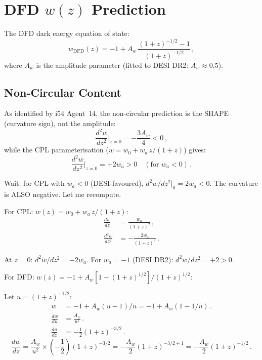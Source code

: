 \documentclass[11pt,a4paper]{article}
\begin{document}
\section{DFD $w(z)$ Prediction}

The DFD dark energy equation of state:
\begin{equation}
w_{\mathrm{DFD}}(z) = -1 + A_w\,\frac{(1+z)^{-1/2} - 1}{(1+z)^{-1/2}}\,,
\end{equation}
where $A_w$ is the amplitude parameter (fitted to DESI DR2: $A_w \approx 0.5$).

\subsection{Non-Circular Content}

As identified by i54 Agent~14, the non-circular prediction is the SHAPE (curvature sign), not the amplitude:
\begin{equation}
\frac{d^2w}{dz^2}\bigg|_{z=0} = -\frac{3A_w}{4} < 0\,,
\end{equation}
while the CPL parameterisation ($w = w_0 + w_a\,z/(1+z)$) gives:
\begin{equation}
\frac{d^2w}{dz^2}\bigg|_{z=0} = +2w_a > 0\quad (\text{for } w_a < 0)\,.
\end{equation}

Wait: for CPL with $w_a < 0$ (DESI-favoured), $d^2w/dz^2|_0 = 2w_a < 0$. The curvature is ALSO negative. Let me recompute.

For CPL: $w(z) = w_0 + w_a\,z/(1+z)$:
\begin{align}
\frac{dw}{dz} &= \frac{w_a}{(1+z)^2}\,, \\
\frac{d^2w}{dz^2} &= -\frac{2w_a}{(1+z)^3}\,.
\end{align}

At $z = 0$: $d^2w/dz^2 = -2w_a$. For $w_a = -1$ (DESI DR2): $d^2w/dz^2 = +2 > 0$.

For DFD: $w(z) = -1 + A_w[1 - (1+z)^{1/2}]/(1+z)^{1/2}$:

Let $u = (1+z)^{-1/2}$:
\begin{align}
w &= -1 + A_w(u - 1)/u = -1 + A_w(1 - 1/u)\,. \\
\frac{dw}{du} &= \frac{A_w}{u^2}\,. \\
\frac{du}{dz} &= -\frac{1}{2}(1+z)^{-3/2}\,.
\end{align}
\begin{equation}
\frac{dw}{dz} = \frac{A_w}{u^2}\times(-\frac{1}{2})(1+z)^{-3/2} = -\frac{A_w}{2}(1+z)^{-3/2+1} = -\frac{A_w}{2}(1+z)^{-1/2}\,.
\end{equation}
\end{document}
